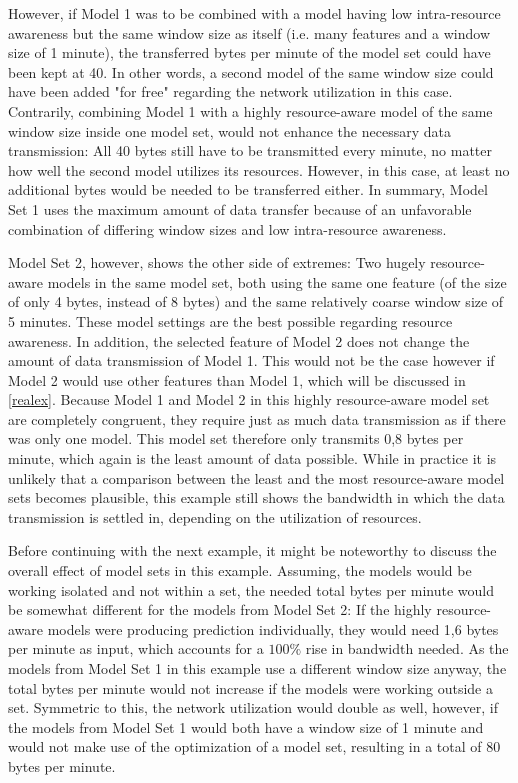 However, if Model 1 was to be combined with a model having low intra-resource awareness but the same window size as itself (i.e. many features and a window size of 1 minute), the transferred bytes per minute of the model set could have been kept at 40. In other words, a second model of the same window size could have been added "for free" regarding the network utilization in this case. Contrarily, combining Model 1 with a highly resource-aware model of the same window size inside one model set, would not enhance the necessary data transmission: All 40 bytes still have to be transmitted every minute, no matter how well the second model utilizes its resources. However, in this case, at least no additional bytes would be needed to be transferred either. In summary, Model Set 1 uses the maximum amount of data transfer because of an unfavorable combination of differing window sizes and low intra-resource awareness.

Model Set 2, however, shows the other side of extremes: Two hugely resource-aware models in the same model set, both using the same one feature (of the size of only 4 bytes, instead of 8 bytes) and the same relatively coarse window size of 5 minutes. These model settings are the best possible regarding resource awareness. In addition, the selected feature of Model 2 does not change the amount of data transmission of Model 1. This would not be the case however if Model 2 would use other features than Model 1, which will be discussed in \autoref{realex}. Because Model 1 and Model 2 in this highly resource-aware model set are completely congruent, they require just as much data transmission as if there was only one model. This model set therefore only transmits 0,8 bytes per minute, which again is the least amount of data possible. While in practice it is unlikely that a comparison between the least and the most resource-aware model sets becomes plausible, this example still shows the bandwidth in which the data transmission is settled in, depending on the utilization of resources.

Before continuing with the next example, it might be noteworthy to discuss the overall effect of model sets in this example. Assuming, the models would be working isolated and not within a set, the needed total bytes per minute would be somewhat different for the models from Model Set 2: If the highly resource-aware models were producing prediction individually, they would need 1,6 bytes per minute as input, which accounts for a $100\%$ rise in bandwidth needed. As the models from Model Set 1 in this example use a different window size anyway, the total bytes per minute would not increase if the models were working outside a set. Symmetric to this, the network utilization would double as well, however, if the models from Model Set 1 would both have a window size of 1 minute and would not make use of the optimization of a model set, resulting in a total of 80 bytes per minute.

